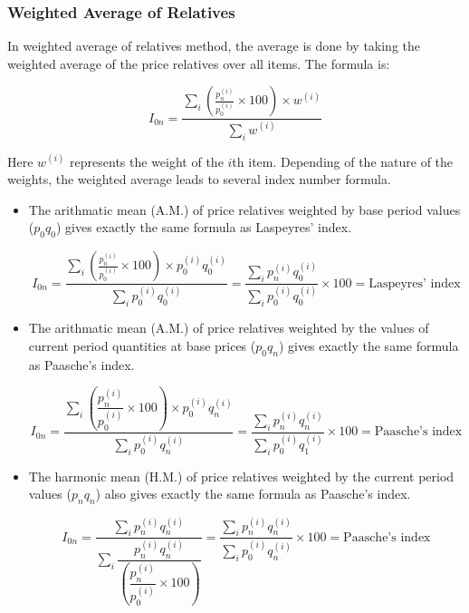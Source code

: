 \documentclass[twoside]{book}
\begin{document}
\subsubsection{Weighted Average of Relatives}
In weighted average of relatives method, the average is done by taking the weighted average of the price relatives over all items. The formula is:
\begin{textbox}
\begin{equation*}
    I_{0n} = \dfrac{\displaystyle\sum_i \left(\frac{p_n^{(i)}}{p_0^{(i)}}\times 100\right) \times w^{(i)}}{\displaystyle\sum_i w^{(i)}}
\end{equation*}
\end{textbox}

Here $w^{(i)}$ represents the weight of the $i$th item. Depending of the nature of the weights, the weighted average leads to several index number formula.
\begin{itemize}
\item The arithmatic mean (A.M.) of price relatives weighted by base period values ($p_0q_0$) gives exactly the same formula as Laspeyres' index.
\begin{textbox}
\begin{equation*}
I_{0n} = \dfrac{\displaystyle\sum_i \left(\frac{p_n^{(i)}}{p_0^{(i)}}\times 100\right) \times p_0^{(i)}q_0^{(i)}}{\displaystyle\sum_i p_0^{(i)}q_0^{(i)}} = \frac{\displaystyle\sum_i p_n^{(i)} q_0^{(i)}}{\displaystyle\sum_i p_0^{(i)} q_0^{(i)}} \times 100= \text{Laspeyres' index}
\end{equation*}
\end{textbox}

\item The arithmatic mean (A.M.) of price relatives weighted by the values of current period quantities at base prices ($p_0q_n$) gives exactly the same formula as Paasche's index.
\begin{textbox}
\begin{equation*}
I_{0n} = \dfrac{\displaystyle\sum_i \left(\dfrac{p_n^{(i)}}{p_0^{(i)}}\times 100\right) \times p_0^{(i)}q_n^{(i)}}{\displaystyle\sum_i p_0^{(i)}q_n^{(i)}}= \frac{\displaystyle\sum_i p_n^{(i)} q_n^{(i)}}{\displaystyle\sum_i p_0^{(i)} q_1^{(i)}} \times 100 = \text{Paasche's index}
\end{equation*}
\end{textbox}

\item The harmonic mean (H.M.) of price relatives weighted by the current period values ($p_nq_n$) also gives exactly the same formula as Paasche's index.
\begin{textbox}
\begin{equation*}
I_{0n} = \dfrac{\displaystyle\sum_i p_n^{(i)}q_n^{(i)}}{\displaystyle\sum_i \dfrac{p_n^{(i)}q_n^{(i)}}{\left( \dfrac{p_n^{(i)}}{p_0^{(i)}}\times 100\right) }}= \frac{\displaystyle\sum_i p_n^{(i)} q_n^{(i)}}{\displaystyle\sum_i p_0^{(i)} q_n^{(i)}} \times 100 = \text{Paasche's index}
\end{equation*}
\end{textbox}
\end{itemize}
\end{document}
